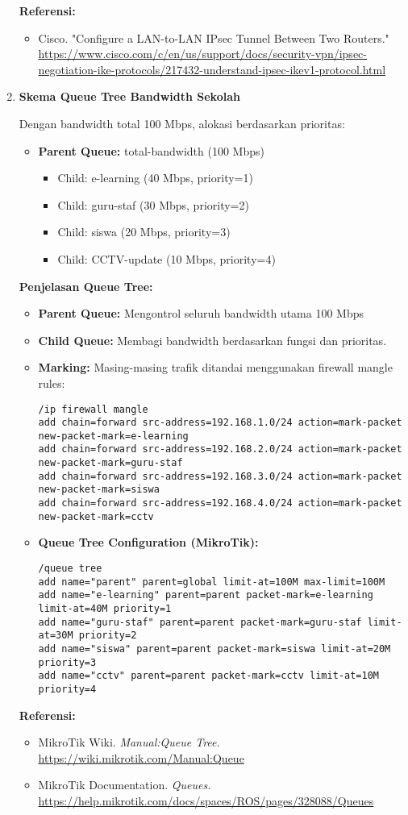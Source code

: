 \begin{enumerate}
\textbf{Referensi:}
\begin{itemize}
	\item Cisco. "Configure a LAN-to-LAN IPsec Tunnel Between Two Routers." \url{https://www.cisco.com/c/en/us/support/docs/security-vpn/ipsec-negotiation-ike-protocols/217432-understand-ipsec-ikev1-protocol.html}
\end{itemize}

\item \textbf{Skema Queue Tree Bandwidth Sekolah}

Dengan bandwidth total 100 Mbps, alokasi berdasarkan prioritas:

\begin{itemize}
	\item \textbf{Parent Queue:} total-bandwidth (100 Mbps)
	\begin{itemize}
		\item Child: e-learning (40 Mbps, priority=1)
		\item Child: guru-staf (30 Mbps, priority=2)
		\item Child: siswa (20 Mbps, priority=3)
		\item Child: CCTV-update (10 Mbps, priority=4)
	\end{itemize}
\end{itemize}

\textbf{Penjelasan Queue Tree:}
\begin{itemize}
	\item \textbf{Parent Queue:} Mengontrol seluruh bandwidth utama 100 Mbps
	\item \textbf{Child Queue:} Membagi bandwidth berdasarkan fungsi dan prioritas.
	\item \textbf{Marking:} Masing-masing trafik ditandai menggunakan firewall mangle rules:
\begin{lstlisting}
/ip firewall mangle
add chain=forward src-address=192.168.1.0/24 action=mark-packet new-packet-mark=e-learning
add chain=forward src-address=192.168.2.0/24 action=mark-packet new-packet-mark=guru-staf
add chain=forward src-address=192.168.3.0/24 action=mark-packet new-packet-mark=siswa
add chain=forward src-address=192.168.4.0/24 action=mark-packet new-packet-mark=cctv
\end{lstlisting}

	\item \textbf{Queue Tree Configuration (MikroTik):}
\begin{lstlisting}
/queue tree
add name="parent" parent=global limit-at=100M max-limit=100M
add name="e-learning" parent=parent packet-mark=e-learning limit-at=40M priority=1
add name="guru-staf" parent=parent packet-mark=guru-staf limit-at=30M priority=2
add name="siswa" parent=parent packet-mark=siswa limit-at=20M priority=3
add name="cctv" parent=parent packet-mark=cctv limit-at=10M priority=4
\end{lstlisting}
\end{itemize}

\textbf{Referensi:}
\begin{itemize}
	\item MikroTik Wiki. \textit{Manual:Queue Tree.} \url{https://wiki.mikrotik.com/Manual:Queue}
	\item MikroTik Documentation. \textit{Queues.} \url{https://help.mikrotik.com/docs/spaces/ROS/pages/328088/Queues}
\end{itemize}
\end{enumerate}
